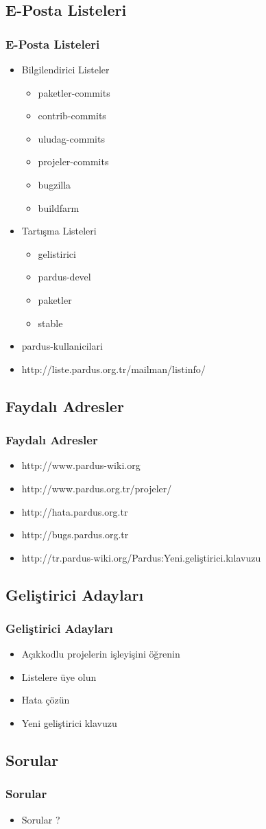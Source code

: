 \documentclass{beamer}
\begin{document}
\subsection{E-Posta Listeleri}
\frame
{
    \frametitle{E-Posta Listeleri}
    \begin{itemize}
        \item Bilgilendirici Listeler
            \begin{itemize}
                \item paketler-commits
                \item contrib-commits
                \item uludag-commits
                \item projeler-commits
                \item bugzilla
                \item buildfarm
            \end{itemize}
        \item  Tartışma Listeleri
            \begin{itemize}
                \item gelistirici
                \item pardus-devel
                \item paketler
                \item stable
            \end{itemize}
        \item pardus-kullanicilari
        \item http://liste.pardus.org.tr/mailman/listinfo/
    \end{itemize}
}

\subsection{Faydalı Adresler}
\frame
{
    \frametitle{Faydalı Adresler}
    \begin{itemize}
        \item http://www.pardus-wiki.org
        \item http://www.pardus.org.tr/projeler/
        \item http://hata.pardus.org.tr
        \item http://bugs.pardus.org.tr
        \item http://tr.pardus-wiki.org/Pardus:Yeni.geliştirici.kılavuzu
    \end{itemize}
}


\subsection{Geliştirici Adayları}
\frame
{
    \frametitle{Geliştirici Adayları}
    \begin{itemize}
        \item Açıkkodlu projelerin işleyişini öğrenin
        \item Listelere üye olun
        \item Hata çözün
        \item Yeni geliştirici klavuzu
    \end{itemize}
}


\subsection{Sorular}
\frame
{
    \frametitle{Sorular}
    \begin{itemize}
        \item Sorular ?
    \end{itemize}
}
\end{document}
